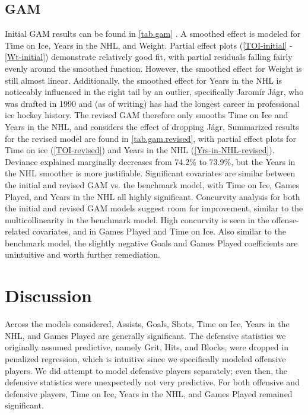 \documentclass[10pt]{article}
\begin{document}
\subsection{GAM}
Initial GAM results can be found in \autoref{tab.gam}%
. A smoothed effect is modeled for Time on Ice, Years in the NHL, and Weight. Partial effect plots (\autoref{TOI-initial} - \autoref{Wt-initial}) demonstrate relatively good fit, with partial residuals falling fairly evenly around the smoothed function. However, the smoothed effect for Weight is still almost linear. Additionally, the smoothed effect for Years in the NHL is noticeably influenced in the right tail by an outlier, specifically Jaromír Jágr, who was drafted in 1990 and (as of writing) has had the longest career in professional ice hockey history. The revised GAM therefore only smooths Time on Ice and Years in the NHL, and considers the effect of dropping Jágr. Summarized results for the revised model are found in \autoref{tab.gam.revised}, with partial effect plots for Time on ice (\autoref{TOI-revised}) and Years in the NHL (\autoref{Yrs-in-NHL-revised}).  Deviance explained marginally decreases from 74.2\% to 73.9\%, but the Years in the NHL smoother is more justifiable. Significant covariates are similar between the initial and revised GAM vs. the benchmark model, with Time on Ice, Games Played, and Years in the NHL all highly significant. Concurvity analysis for both the initial and revised GAM models suggest room for improvement, similar to the multicollinearity in the benchmark model. High concurvity is seen in the offense-related covariates, and in Games Played and Time on Ice. Also similar to the benchmark model, the slightly negative Goals and Games Played coefficients are unintuitive and worth further remediation.

\section{Discussion}
Across the models considered, Assists, Goals, Shots, Time on Ice, Years in the NHL, and Games Played are generally significant. The defensive statistics we originally assumed predictive, namely Grit, Hits, and Blocks, were dropped in penalized regression, which is intuitive since we specifically modeled offensive players. We did attempt to model defensive players separately; even then, the defensive statistics were unexpectedly not very predictive. For both offensive and defensive players, Time on Ice, Years in the NHL, and Games Played remained significant.
\end{document}
